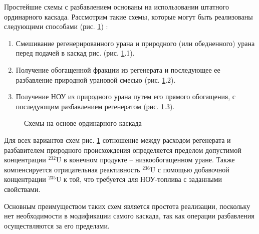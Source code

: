 Простейшие схемы с разбавлением основаны на использовании штатного ординарного каскада. Рассмотрим такие схемы, которые могут быть реализованы следующими способами (рис. \ref{fig:diagram1}) \cite{ксенофонтовИсследованиеПроблемыВовлечения1988,borodynyaIssledovanieProblemyVovlecheniya1989,sulaberidzeNekotoryhRazdelitelnyhProblemah2004,smirnovKaskadnyeShemyZadachah2012}:

\begin{enumerate}
  \item Смешивание регенерированного урана и природного (или обедненного) урана перед подачей в каскад рис. (рис. \ref{fig:diagram1}.1).
  \item Получение обогащенной фракции из регенерата и последующее ее разбавление природной урановой смесью (рис. \ref{fig:diagram1}.2).
  \item Получение НОУ из природного урана путем его прямого обогащения, с последующим разбавлением регенератом (рис. \ref{fig:diagram1}.3).
\end{enumerate}

\begin{figure}[ht]
  \caption{Схемы на основе ординарного каскада}\label{fig:diagram1}
\end{figure}

Для всех вариантов схем рис. \ref{fig:diagram1} сотношение между расходом регенерата и разбавителем природного происхождения определяется пределом допустимой концентрации $^{232}$U в конечном продукте -- низкообогащенном уране. Также компенсируется отрицательная реактивность $^{236}$U с помощью добавочной концентрации $^{235}$U к той, что требуется для НОУ-топлива с заданными свойствами.

Основным преимуществом таких схем является простота реализации, поскольку нет необходимости в модификации самого каскада, так как операции разбавления осуществляются за его пределами.

